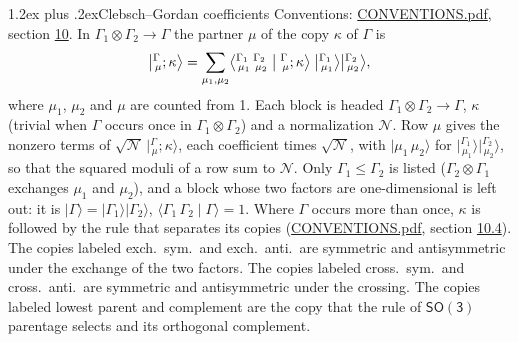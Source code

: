 \documentclass[10pt,a4paper]{article}
\makeatletter
\renewcommand\section{\@startsection{section}{1}{\z@}{-3ex plus -1ex minus -.2ex}%
  {1.2ex plus .2ex}{\normalfont\large\sffamily\bfseries\color{parttitle}}}
\numberwithin{equation}{section}
\newcommand{\grp}[1]{\mathsf{#1}}
\newcommand{\irrprod}{\otimes}
\newcommand{\mult}{\kappa}
\newcommand{\intx}{\mu}
\newcommand{\cgnorm}{\mathcal{N}}
\newcommand{\cgket}[3]{\bigl\lvert{}^{#1}_{\,#2};#3\bigr\rangle}
\newcommand{\irket}[2]{\bigl\lvert{}^{#1}_{\,#2}\bigr\rangle}
\newcommand{\prodket}[2]{\lvert {#1}\,{#2}\rangle}
\newcommand{\ket}[1]{\lvert #1\rangle}
\newcommand{\cgck}[7]{\bigl\langle{}^{#1}_{\,#2}\,{}^{#3}_{\,#4}\bigm\vert{}^{#5}_{\,#6};#7\bigr\rangle}
\newcommand{\cgcone}[3]{\langle #1\,#2\mid #3\rangle}
\makeatother
\begin{document}
\section{Clebsch--Gordan coefficients}\label{s:clebsch_gordan}
Conventions: \href{../../CONVENTIONS.pdf}{CONVENTIONS.pdf}, section \href{../../CONVENTIONS.pdf\#conv.10}{10}.
\leavevmode\label{n:index.copy}\label{n:index.cg}\label{n:vector.ket.coupled}\label{n:function.cg.copy}In $\Gamma_1\irrprod\Gamma_2\to\Gamma$ the partner $\intx$ of the copy $\mult$ of $\Gamma$ is
\begin{equation}\label{e:cg}\cgket{\Gamma}{\intx}{\mult} = \sum_{\intx_1,\intx_2}\cgck{\Gamma_1}{\intx_1}{\Gamma_2}{\intx_2}{\Gamma}{\intx}{\mult}\;\irket{\Gamma_1}{\intx_1}\irket{\Gamma_2}{\intx_2},\end{equation}
where $\intx_1$, $\intx_2$ and $\intx$ are counted from 1. \label{n:index.normalisation}Each block is headed $\Gamma_1\irrprod\Gamma_2\to\Gamma$, $\mult$ (trivial when $\Gamma$ occurs once in $\Gamma_1\irrprod\Gamma_2$) and a normalization $\cgnorm$. \label{n:vector.ket.product}Row $\intx$ gives the nonzero terms of $\sqrt{\cgnorm}\,\cgket{\Gamma}{\intx}{\mult}$, each coefficient times $\sqrt{\cgnorm}$, with $\prodket{\intx_1}{\intx_2}$ for $\irket{\Gamma_1}{\intx_1}\irket{\Gamma_2}{\intx_2}$, so that the squared moduli of a row sum to $\cgnorm$. \label{n:function.cg.one}Only $\Gamma_1 \le \Gamma_2$ is listed ($\Gamma_2\irrprod\Gamma_1$ exchanges $\intx_1$ and $\intx_2$), and a block whose two factors are one-dimensional is left out: it is $\ket{\Gamma} = \ket{\Gamma_1}\ket{\Gamma_2}$, $\cgcone{\Gamma_1}{\Gamma_2}{\Gamma} = 1$.
Where $\Gamma$ occurs more than once, $\mult$ is followed by the rule that separates its copies (\href{../../CONVENTIONS.pdf}{CONVENTIONS.pdf}, section \href{../../CONVENTIONS.pdf\#conv.10.4}{10.4}). \label{n:abbreviation.exchange}The copies labeled exch.\ sym.\ and exch.\ anti.\ are symmetric and antisymmetric under the exchange of the two factors. \label{n:abbreviation.crossing}The copies labeled cross.\ sym.\ and cross.\ anti.\ are symmetric and antisymmetric under the crossing. \label{n:abbreviation.parent}The copies labeled lowest parent and complement are the copy that the rule of \href{SO3.pdf}{$\grp{SO(3)}$} parentage selects and its orthogonal complement.
\end{document}
